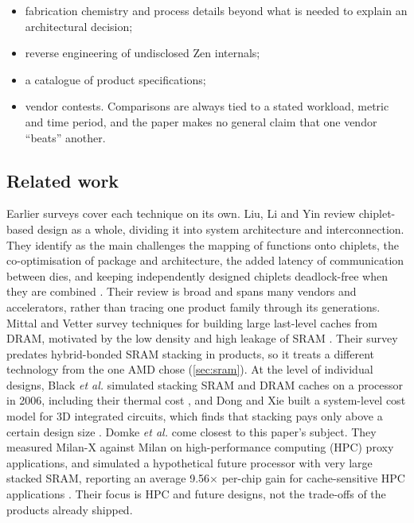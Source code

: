 \begin{itemize}
  \item fabrication chemistry and process details beyond what is needed to explain an architectural decision;
  \item reverse engineering of undisclosed Zen internals;
  \item a catalogue of product specifications;
  \item vendor contests. Comparisons are always tied to a stated workload, metric and time period, and the paper makes no general claim that one vendor ``beats'' another.
\end{itemize}

\subsection{Related work}
\label{sec:related-work}
Earlier surveys cover each technique on its own. Liu, Li and Yin review chiplet-based design as a whole, dividing it into system architecture and interconnection. They identify as the main challenges the mapping of functions onto chiplets, the co-optimisation of package and architecture, the added latency of communication between dies, and keeping independently designed chiplets deadlock-free when they are combined \cite{liuReviewChipletbasedDesign2024}. Their review is broad and spans many vendors and accelerators, rather than tracing one product family through its generations. Mittal and Vetter survey techniques for building large last-level caches from DRAM, motivated by the low density and high leakage of SRAM \cite{mittalSurveyTechniquesArchitecting2016}. Their survey predates hybrid-bonded SRAM stacking in products, so it treats a different technology from the one AMD chose (\cref{sec:sram}). At the level of individual designs, Black \emph{et al.} simulated stacking SRAM and DRAM caches on a processor in 2006, including their thermal cost \cite{blackStacking3DMicroarchitecture2006}, and Dong and Xie built a system-level cost model for 3D integrated circuits, which finds that stacking pays only above a certain design size \cite{dongSystemlevelCostAnalysis2009}. Domke \emph{et al.} come closest to this paper's subject. They measured Milan-X against Milan on high-performance computing (HPC) proxy applications, and simulated a hypothetical future processor with very large stacked SRAM, reporting an average 9.56$\times$ per-chip gain for cache-sensitive HPC applications \cite{domkeLocusPerformanceQuantifying2023}. Their focus is HPC and future designs, not the trade-offs of the products already shipped.


